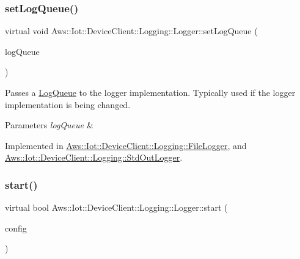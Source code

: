 \subsubsection{\texorpdfstring{set\+Log\+Queue()}{setLogQueue()}}
{\footnotesize\ttfamily virtual void Aws\+::\+Iot\+::\+Device\+Client\+::\+Logging\+::\+Logger\+::set\+Log\+Queue (\begin{DoxyParamCaption}\item[{std\+::unique\+\_\+ptr$<$ \hyperlink{class_aws_1_1_iot_1_1_device_client_1_1_logging_1_1_log_queue}{Log\+Queue} $>$}]{log\+Queue }\end{DoxyParamCaption})\hspace{0.3cm}{\ttfamily [pure virtual]}}



Passes a \hyperlink{class_aws_1_1_iot_1_1_device_client_1_1_logging_1_1_log_queue}{Log\+Queue} to the logger implementation. Typically used if the logger implementation is being changed. 


\begin{DoxyParams}{Parameters}
{\em log\+Queue} & \\
\hline
\end{DoxyParams}


Implemented in \hyperlink{class_aws_1_1_iot_1_1_device_client_1_1_logging_1_1_file_logger_a42b047d2f2379638add126414690d65d}{Aws\+::\+Iot\+::\+Device\+Client\+::\+Logging\+::\+File\+Logger}, and \hyperlink{class_aws_1_1_iot_1_1_device_client_1_1_logging_1_1_std_out_logger_aa35c525dc9aa3fef0f1f244781d304ea}{Aws\+::\+Iot\+::\+Device\+Client\+::\+Logging\+::\+Std\+Out\+Logger}.

\mbox{\label{class_aws_1_1_iot_1_1_device_client_1_1_logging_1_1_logger_ad42e38afcd7402f5dc1213b2f0b96961}} 
\subsubsection{\texorpdfstring{start()}{start()}}
{\footnotesize\ttfamily virtual bool Aws\+::\+Iot\+::\+Device\+Client\+::\+Logging\+::\+Logger\+::start (\begin{DoxyParamCaption}\item[{const \hyperlink{struct_aws_1_1_iot_1_1_device_client_1_1_plain_config}{Plain\+Config} \&}]{config }\end{DoxyParamCaption})\hspace{0.3cm}{\ttfamily [pure virtual]}}



